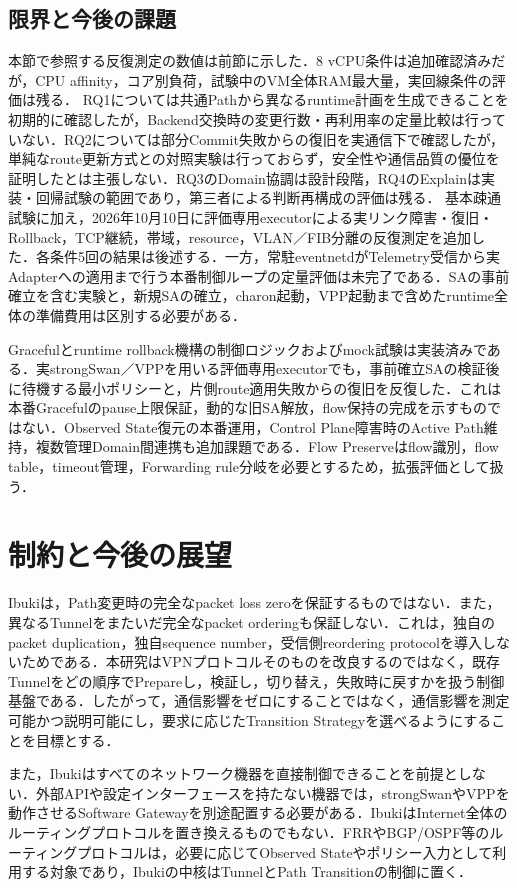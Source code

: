 \documentclass[11pt,a4paper,twoside]{ltjsarticle}
\begin{document}
\subsection{限界と今後の課題}
本節で参照する反復測定の数値は前節に示した．8 vCPU条件は追加確認済みだが，CPU affinity，コア別負荷，試験中のVM全体RAM最大量，実回線条件の評価は残る．
RQ1については共通Pathから異なるruntime計画を生成できることを初期的に確認したが，Backend交換時の変更行数・再利用率の定量比較は行っていない．RQ2については部分Commit失敗からの復旧を実通信下で確認したが，単純なroute更新方式との対照実験は行っておらず，安全性や通信品質の優位を証明したとは主張しない．RQ3のDomain協調は設計段階，RQ4のExplainは実装・回帰試験の範囲であり，第三者による判断再構成の評価は残る．
基本疎通試験に加え，2026年10月10日に評価専用executorによる実リンク障害・復旧・Rollback，TCP継続，帯域，resource，VLAN／FIB分離の反復測定を追加した．各条件5回の結果は後述する．一方，常駐eventnetdがTelemetry受信から実Adapterへの適用まで行う本番制御ループの定量評価は未完了である．SAの事前確立を含む実験と，新規SAの確立，charon起動，VPP起動まで含めたruntime全体の準備費用は区別する必要がある．

Gracefulとruntime rollback機構の制御ロジックおよびmock試験は実装済みである．実strongSwan／VPPを用いる評価専用executorでも，事前確立SAの検証後に待機する最小ポリシーと，片側route適用失敗からの復旧を反復した．これは本番Gracefulのpause上限保証，動的な旧SA解放，flow保持の完成を示すものではない．Observed State復元の本番運用，Control Plane障害時のActive Path維持，複数管理Domain間連携も追加課題である．Flow Preserveはflow識別，flow table，timeout管理，Forwarding rule分岐を必要とするため，拡張評価として扱う．

\section{制約と今後の展望}
Ibukiは，Path変更時の完全なpacket loss zeroを保証するものではない．また，異なるTunnelをまたいだ完全なpacket orderingも保証しない．これは，独自のpacket duplication，独自sequence number，受信側reordering protocolを導入しないためである．本研究はVPNプロトコルそのものを改良するのではなく，既存Tunnelをどの順序でPrepareし，検証し，切り替え，失敗時に戻すかを扱う制御基盤である．したがって，通信影響をゼロにすることではなく，通信影響を測定可能かつ説明可能にし，要求に応じたTransition Strategyを選べるようにすることを目標とする．

また，Ibukiはすべてのネットワーク機器を直接制御できることを前提としない．外部APIや設定インターフェースを持たない機器では，strongSwanやVPPを動作させるSoftware Gatewayを別途配置する必要がある．IbukiはInternet全体のルーティングプロトコルを置き換えるものでもない．FRRやBGP/OSPF等のルーティングプロトコルは，必要に応じてObserved Stateやポリシー入力として利用する対象であり，Ibukiの中核はTunnelとPath Transitionの制御に置く．
\end{document}

